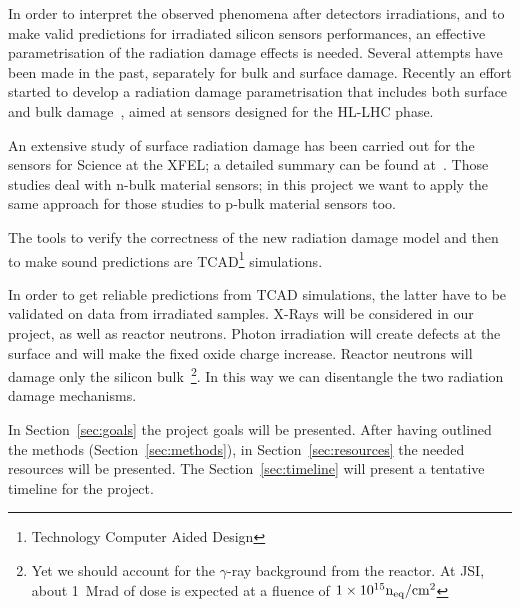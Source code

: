 \documentclass[dvips,12pt]{article}
\begin{document}
In order to interpret the observed phenomena after detectors irradiations,
 and to make valid predictions for irradiated silicon 
sensors performances, an effective parametrisation of the radiation damage effects is needed. 
Several attempts have been made in the past, separately for bulk and surface damage. 
Recently an effort started to develop a radiation damage parametrisation that includes both 
surface and bulk damage~\cite{Passeri2015}, aimed at sensors designed for the HL-LHC 
phase.

An extensive study of surface radiation damage has been carried out for the sensors 
for Science at the XFEL; a detailed summary can be found at~\cite{zhang-thesis}.
Those studies deal with n-bulk material sensors; in this project we want to apply the 
same approach for those studies to p-bulk material sensors too.

The tools to verify the correctness of the new radiation damage model and then to make 
sound predictions are TCAD\footnote{Technology Computer Aided Design} simulations. 

In order to get reliable predictions from TCAD simulations, the latter have to be validated 
on data from irradiated samples. X-Rays will be considered in our project, as 
well as reactor neutrons.
Photon irradiation will create defects at the surface and will make the fixed oxide charge increase. 
Reactor neutrons will damage only the silicon bulk~\footnote{Yet we should account for the 
$\gamma$-ray background from the reactor. At JSI, about 1~Mrad of dose is expected 
at a fluence of $1\times10^{15} {\rm n_{eq}/cm^2}$}. In this way we can disentangle the two 
radiation damage mechanisms.  

In Section~\ref{sec:goals} the project goals will be presented. After having outlined the methods 
(Section~\ref{sec:methods}), in Section~\ref{sec:resources} the needed resources will be 
presented. The Section~\ref{sec:timeline} will present a tentative timeline for the project. 
\end{document}
